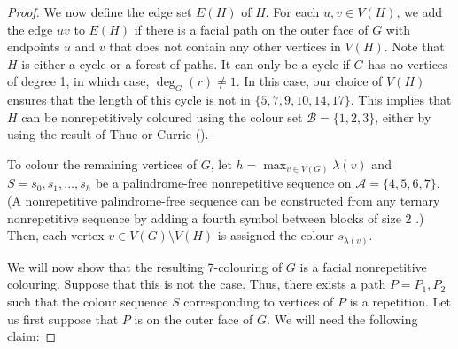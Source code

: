 \documentclass{patmorin}
\begin{document}
\begin{proof}
We now define the edge set $E(H)$ of $H$.  For each $u,v\in V(H)$,
we add the edge $uv$ to $E(H)$ if there is a facial path on the outer
face of $G$ with endpoints $u$ and $v$ that does not contain any other
vertices in $V(H)$.  Note that $H$ is either a cycle or a forest of
paths. It can only be a cycle if $G$ has no vertices of degree 1,
in which case, $\deg_G(r)\neq 1$.  In this case, our choice of $V(H)$
ensures that the length of this cycle is not in  $\{5,7,9,10,14,17\}$.
This implies that $H$ can be nonrepetitively coloured using the colour set
$\mathcal{B}=\{1,2,3\}$, either by using the result of Thue \cite{thue1906uber}
or Currie ().

To colour the remaining vertices of $G$, let $h=\max_{v \in
V(G)} \lambda(v)$ and $S=s_0,s_1,\ldots,s_h$ be a palindrome-free
nonrepetitive sequence on $\mathcal{A}=\{4,5,6,7\}$.  (A nonrepetitive
palindrome-free sequence can be constructed from any ternary
nonrepetitive sequence by adding a fourth symbol between blocks of size
2 \cite{brevsar2007nonrepetitive}.) Then, each vertex $v\in V(G)\setminus
V(H)$ is assigned the colour $s_{\lambda(v)}$.

We will now show that the resulting 7-colouring of $G$ is a facial
nonrepetitive colouring. Suppose that this is not the case. Thus,
there exists a path $P=P_1,P_2$ such that the colour sequence $S$
corresponding to vertices of $P$ is a repetition. Let us first suppose
that $P$ is on the outer face of $G$. We will need the following claim:


\end{proof}
\end{document}
